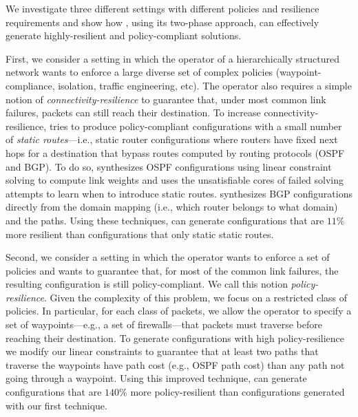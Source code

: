 We investigate three different settings with different policies and resilience requirements
and show how \name, using its two-phase approach, can effectively generate
highly-resilient and policy-compliant solutions.

First, we consider a setting in which the operator of a hierarchically
structured network wants to enforce a large diverse set of complex
policies (waypoint-compliance, isolation, traffic engineering, etc).
The operator also requires a simple notion of
\emph{connectivity-resilience} to guarantee that, under most common
link failures, packets can still reach their destination.
To increase connectivity-resilience, \name tries to produce
policy-compliant configurations with a small number of {\em static
  routes}---i.e., static router configurations where routers have
fixed next hops for a destination that bypass routes computed by routing protocols (OSPF and BGP).
To do so, \name synthesizes OSPF configurations using linear constraint solving to compute
link weights and uses the unsatisfiable cores
of failed solving attempts to learn when to introduce static routes.
\name synthesizes BGP configurations directly from the domain mapping (i.e., which router belongs to what domain) and the paths.
Using these techniques, \name can generate configurations that are
$11\%$ more resilient than configurations that only static static routes.

Second, we consider a setting in which the operator wants to enforce a
set of policies and wants to guarantee that, for most of the common
link failures, the resulting configuration is still policy-compliant.
We call this notion \emph{policy-resilience}.  Given the complexity of
this problem, we focus on a {\rm restricted class} of policies.  In
particular, for each class of packets, we allow the operator to
specify a set of waypoints---e.g., a set of firewalls---that packets
must traverse before reaching their destination.  To generate
configurations with high policy-resilience we modify our linear
constraints to guarantee that at least two paths that traverse the
waypoints have path cost (e.g., OSPF path cost) than any path not
going through a waypoint.  Using this improved technique, \name can
generate configurations that are $140\%$ more policy-resilient than
configurations generated with our first technique.


